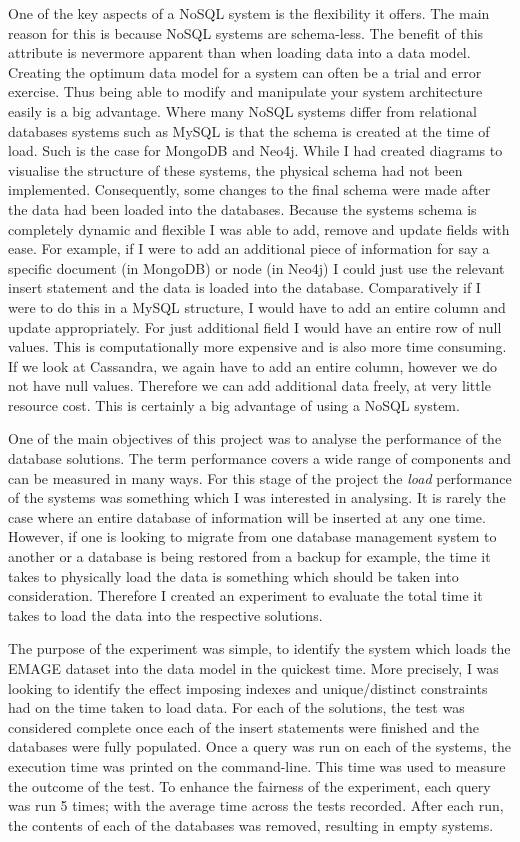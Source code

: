 One of the key aspects of a NoSQL system is the flexibility it offers. The main reason for this is because NoSQL systems are schema-less. The benefit of this attribute is nevermore apparent than when loading data into a data model. Creating the optimum data model for a system can often be a trial and error exercise. Thus being able to modify and manipulate your system architecture easily is a big advantage. Where many NoSQL systems differ from relational databases systems such as MySQL is that the schema is created at the time of load. Such is the case for MongoDB and Neo4j. While I had created diagrams to visualise the structure of these systems, the physical schema had not been implemented. Consequently, some changes to the final schema were made after the data had been loaded into the databases. Because the systems schema is completely dynamic and flexible I was able to add, remove and update fields with ease. For example, if I were to add an additional piece of information for say a specific document (in MongoDB) or node (in Neo4j) I could just use the relevant insert statement and the data is loaded into the database. Comparatively if I were to do this in a MySQL structure, I would have to add an entire column and update appropriately. For just additional field I would have an entire row of null values. This is computationally more expensive and is also more time consuming. If we look at Cassandra, we again have to add an entire column, however we do not have null values. Therefore we can add additional data freely, at very little resource cost. This is certainly a big advantage of using a NoSQL system.

One of the main objectives of this project was to analyse the performance of the database solutions. The term performance covers a wide range of components and can be measured in many ways. For this stage of the project the \textit{load} performance of the systems was something which I was interested in analysing. It is rarely the case where an entire database of information will be inserted at any one time. However, if one is looking to migrate from one database management system to another or a database is being restored from a backup for example, the time it takes to physically load the data is something which should be taken into consideration. Therefore I created an experiment to evaluate the total time it takes to load the data into the respective solutions.

The purpose of the experiment was simple, to identify the system which loads the EMAGE dataset into the data model in the quickest time. More precisely, I was looking to identify the effect imposing indexes and unique/distinct constraints had on the time taken to load data. For each of the solutions, the test was considered complete once each of the insert statements were finished and the databases were fully populated. Once a query was run on each of the systems, the execution time was printed on the command-line. This time was used to measure the outcome of the test. To enhance the fairness of the experiment, each query was run 5 times; with the average time across the tests recorded. After each run, the contents of each of the databases was removed, resulting in empty systems.

